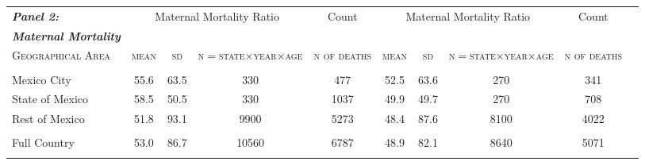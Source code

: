 \begin{tabular}{lccccccccc}
 
\multirow{1}{*}{\textbf{\textit{Panel 2:}}} &
\multicolumn{3}{c}{Maternal Mortality Ratio}&\multicolumn{1}{c}{Count}&\multicolumn{3}{c}{Maternal Mortality Ratio}&\multicolumn{1}{c}{Count}\\ \cmidrule(r){2-4}\cmidrule(r){5-5} \cmidrule(l){6-8}\cmidrule(l){9-9}
\textbf{\textit{Maternal Mortality}}	&  &  &  &  & 	&  &  &  &     \\
\textsc{Geographical Area}	&	\textsc{mean}	&	\textsc{sd}	&		\textsc{n$=$state$\times$year$\times$age}	&	\textsc{n of deaths}	&	\textsc{mean}	&	\textsc{sd}	&		\textsc{n$=$state$\times$year$\times$age}	&	\textsc{n of deaths}	\\\cmidrule(r){2-5} \cmidrule(l){6-9} 
&		&		&		&		&		&		&		&		\\
Mexico City	&	55.6 	&	63.5 	&	330	&	477	&	52.5 	&	63.6 	&	270	&	341	\\
State of Mexico 	&	58.5 	&	50.5 	&	330	&	1037	&	49.9 	&	49.7 	&	270	&	708	\\
Rest of Mexico	&	51.8 	&	93.1  	&	9900	&	5273	&	48.4 	&	87.6 	&	8100	&	4022	\\
&		&		&		&		&		&		&		&		\\
Full Country	&	53.0 	&	86.7 	&	10560	&	6787	&	48.9	&	82.1 	&	8640	&	5071	\\
&		&		&		&		&		&		&		&		\\
 \hline\hline
\end{tabular}